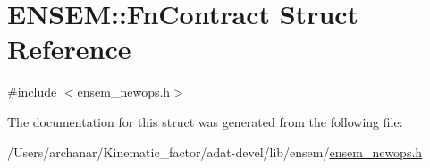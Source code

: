 \hypertarget{structENSEM_1_1FnContract}{}\section{E\+N\+S\+EM\+:\+:Fn\+Contract Struct Reference}
\label{structENSEM_1_1FnContract}


{\ttfamily \#include $<$ensem\+\_\+newops.\+h$>$}



The documentation for this struct was generated from the following file\+:\begin{DoxyCompactItemize}
\item 
/\+Users/archanar/\+Kinematic\+\_\+factor/adat-\/devel/lib/ensem/\mbox{\hyperlink{adat-devel_2lib_2ensem_2ensem__newops_8h}{ensem\+\_\+newops.\+h}}\end{DoxyCompactItemize}
